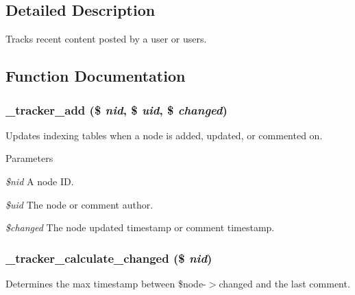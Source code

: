 \subsection{Detailed Description}
Tracks recent content posted by a user or users. 

\subsection{Function Documentation}
\hypertarget{tracker_8module_a742289477e9eedbcebe46fd6742241b1}{
\subsubsection[{\_\-tracker\_\-add}]{\setlength{\rightskip}{0pt plus 5cm}\_\-tracker\_\-add (\$ {\em nid}, \/  \$ {\em uid}, \/  \$ {\em changed})}}
\label{tracker_8module_a742289477e9eedbcebe46fd6742241b1}
Updates indexing tables when a node is added, updated, or commented on.


\begin{DoxyParams}{Parameters}
\item[{\em \$nid}]A node ID. \item[{\em \$uid}]The node or comment author. \item[{\em \$changed}]The node updated timestamp or comment timestamp. \end{DoxyParams}
\hypertarget{tracker_8module_a9595bd37607687d5271ca52aaa91eed7}{
\subsubsection[{\_\-tracker\_\-calculate\_\-changed}]{\setlength{\rightskip}{0pt plus 5cm}\_\-tracker\_\-calculate\_\-changed (\$ {\em nid})}}
\label{tracker_8module_a9595bd37607687d5271ca52aaa91eed7}
Determines the max timestamp between \$node-\/$>$changed and the last comment.


